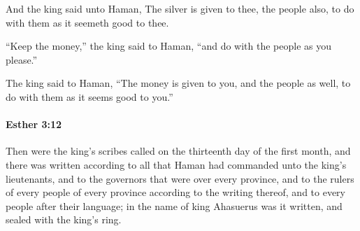 			\begin{versebox}
					\item[BHS] 
					\item[LXX] 
					\item[ASV] And the king said unto Haman, The silver is given to thee, the people also, to do with them as it seemeth good to thee.
					\item[NIV] “Keep the money,” the king said to Haman, “and do with the people as you please.”
					\item[NRSV] The king said to Haman, “The money is given to you, and the people as well, to do with them as it seems good to you.”
			\end{versebox}

		\paragraph{Esther 3:12} %
			\label{ESTHER-3-12}

			Then were the king’s scribes called on the thirteenth day of the first month, and there was written according to all that Haman had commanded unto the king’s lieutenants, and to the governors that were over every province, and to the rulers of every people of every province according to the writing thereof, and to every people after their language; in the name of king Ahasuerus was it written, and sealed with the king’s ring.

